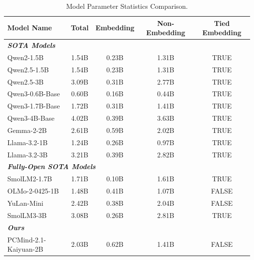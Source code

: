 \begin{table}[htbp]
\centering
\caption{Model Parameter Statistics Comparison.}
\label{tab:model_params_comparison}
\begin{tabular}{lcccc}
\toprule
\textbf{Model Name} & \textbf{Total} & \textbf{Embedding} & \textbf{Non-Embedding} & \textbf{Tied Embedding}\\
\midrule
\multicolumn{5}{l}{\textit{\textbf{SOTA Models}}} \\
\rowcolor{openweight} Qwen2-1.5B & 1.54B & 0.23B & 1.31B & TRUE\\
\rowcolor{openweight} Qwen2.5-1.5B & 1.54B & 0.23B & 1.31B & TRUE\\
\rowcolor{openweight} Qwen2.5-3B & 3.09B & 0.31B & 2.77B & TRUE\\
\rowcolor{openweight} Qwen3-0.6B-Base & 0.60B & 0.16B & 0.44B & TRUE\\
\rowcolor{openweight} Qwen3-1.7B-Base & 1.72B & 0.31B & 1.41B & TRUE\\
\rowcolor{openweight} Qwen3-4B-Base & 4.02B & 0.39B & 3.63B & TRUE\\
\rowcolor{openweight} Gemma-2-2B & 2.61B & 0.59B & 2.02B & TRUE\\
\rowcolor{openweight} Llama-3.2-1B & 1.24B & 0.26B & 0.97B & TRUE\\
\rowcolor{openweight} Llama-3.2-3B & 3.21B & 0.39B & 2.82B & TRUE\\
\multicolumn{5}{l}{\textit{\textbf{Fully-Open SOTA Models}}} \\
\rowcolor{fullyopen} SmolLM2-1.7B & 1.71B & 0.10B & 1.61B & TRUE\\
\rowcolor{fullyopen} OLMo-2-0425-1B & 1.48B & 0.41B & 1.07B & FALSE\\
\rowcolor{fullyopen} YuLan-Mini & 2.42B & 0.38B & 2.04B & FALSE\\
\rowcolor{fullyopen} SmolLM3-3B & 3.08B & 0.26B & 2.81B & TRUE\\
\multicolumn{5}{l}{\textit{\textbf{Ours}}} \\
\rowcolor{ours} PCMind-2.1-Kaiyuan-2B & 2.03B & 0.62B & 1.41B & FALSE\\
\bottomrule
\end{tabular}
\end{table}
